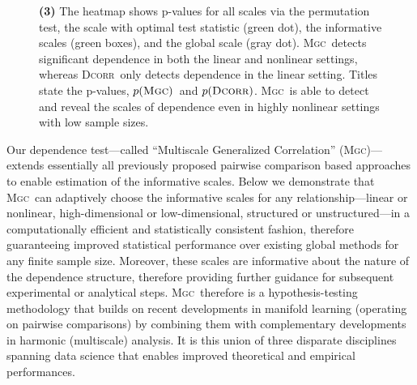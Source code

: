 \documentclass[11pt]{article}
\providecommand{\sct}[1]{{\normalfont\textsc{#1}}}
\newcommand{\Mgc}{\sct{Mgc}}
\newcommand{\Dcorr}{\sct{Dcorr}}
\begin{document}
\begin{figure}
{%
\textbf{(3)} %
The heatmap shows p-values for all scales via the permutation test, the scale with optimal test statistic (green dot), the informative scales (green boxes), and the global scale (gray dot). \Mgc~detects significant dependence in both the linear and nonlinear settings, whereas \Dcorr~only detects dependence in the linear setting.%
Titles state the p-values,  $p(\Mgc)$~and $p(\Dcorr)$.
% 
\Mgc~is able to detect and reveal the scales of dependence even in highly nonlinear settings with low sample sizes.}
\label{f:newschem}
\end{figure}



Our  dependence test---called ``Multiscale Generalized Correlation'' (\Mgc)---extends essentially all previously proposed pairwise comparison based approaches to enable estimation of the  informative scales.   
Below we demonstrate that \Mgc~can adaptively choose the informative scales for any relationship---linear or nonlinear, high-dimensional or low-dimensional, structured or unstructured---in a computationally efficient and statistically consistent fashion, therefore guaranteeing improved statistical performance over existing global methods for any finite sample size. Moreover, these scales are informative about the nature of the dependence structure, therefore providing further guidance for subsequent experimental or analytical steps. \Mgc~therefore is a hypothesis-testing methodology that builds on recent developments in manifold learning (operating on pairwise comparisons) by combining them with complementary developments in harmonic (multiscale) analysis. 
It is this union of three disparate disciplines spanning data science that enables improved theoretical and empirical performances.  
\end{document}
